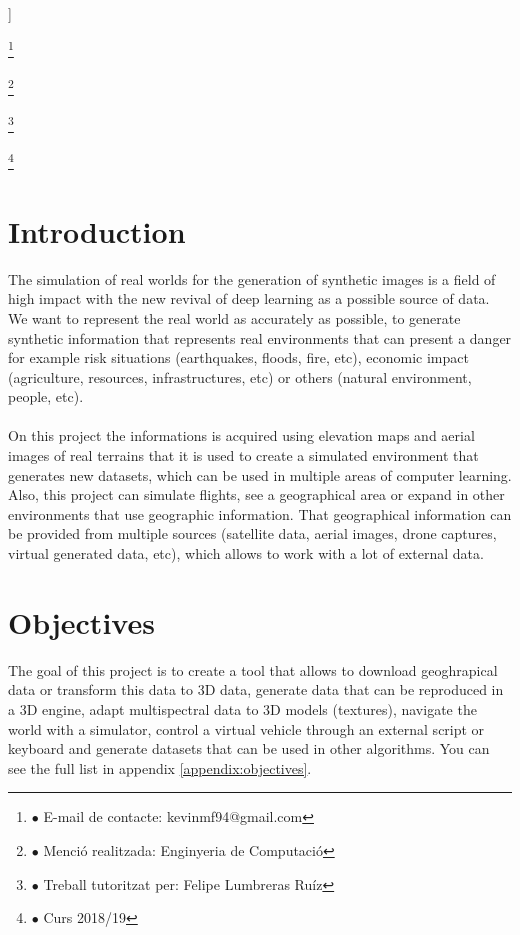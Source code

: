 \documentclass[10pt,a4paper,twocolumn,twoside]{article}
\newcommand\blfootnote[1]{%
  \begingroup
  \renewcommand\thefootnote{}\footnote{#1}%
  \addtocounter{footnote}{-1}%
  \endgroup
}
\begin{document}
\begin{@twocolumnfalse}
\begin{center}
\bigskip

{\vrule depth 0pt height 0.5pt width 4cm\hspace{7.5pt}%
%
\hspace{7.5pt}\vrule depth 0pt height 0.5pt width 4cm\relax}

\end{center}

\bigskip
\end{@twocolumnfalse}]

\blfootnote{$\bullet$ E-mail de contacte: kevinmf94@gmail.com}
\blfootnote{$\bullet$ Menció realitzada: Enginyeria de Computació}
\blfootnote{$\bullet$ Treball tutoritzat per: Felipe Lumbreras Ruíz}
\blfootnote{$\bullet$ Curs 2018/19}

\vspace{-1cm}
\section{Introduction}
The simulation of real worlds for the generation of synthetic images is a field of high impact with the new revival of deep learning as a possible source of data. We want to represent the real world as accurately as possible, to generate synthetic information that represents real environments that can present a danger for example risk situations (earthquakes, floods, fire, etc), economic impact (agriculture, resources, infrastructures, etc) or others (natural environment, people, etc).
\\
\\
On this project the informations is acquired using elevation maps and aerial images of real terrains that it is used to create a simulated environment that generates new datasets, which can be used in multiple areas of computer learning. Also, this project can simulate flights, see a geographical area or expand in other environments that use geographic information. That geographical information can be provided from multiple sources (satellite data, aerial images, drone captures, virtual generated data, etc), which allows to work with a lot of external data.

\section{Objectives}

The goal of this project is to create a tool that allows to download geoghrapical data or transform this data to 3D data, generate data that can be reproduced in a 3D engine, adapt multispectral data to 3D models (textures), navigate the world with a simulator, control a virtual vehicle through an external script or keyboard and generate datasets that can be used in other algorithms. You can see the full list in appendix \ref{appendix:objectives}.
\end{document}
